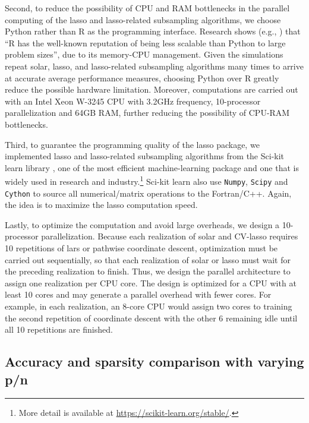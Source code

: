 \documentclass[12pt]{article}
\begin{document}
Second, to reduce the possibility of CPU and RAM bottlenecks in the parallel computing of the lasso and lasso-related subsampling algorithms, we choose Python rather than R as the programming interface. Research shows (e.g., \citet{donoho201750})  that ``R has the well-known reputation of being less scalable than Python to large problem sizes'', due to its memory-CPU management. Given the simulations repeat solar, lasso, and lasso-related subsampling algorithms many times to arrive at accurate average performance measures, choosing Python over R greatly reduce the possible hardware limitation. Moreover, computations are carried out with an Intel Xeon W-3245 CPU with 3.2GHz frequency, 10-processor parallelization and 64GB RAM, further reducing the possibility of CPU-RAM bottlenecks.

Third, to guarantee the programming quality of the lasso package, we implemented lasso and lasso-related subsampling algorithms from the {\sf Sci-kit learn} library \citep{scikit-learn}, one of the most efficient machine-learning package and one that is widely used in research and industry.\footnote{More detail is available at \url{https://scikit-learn.org/stable/}.} {\sf Sci-kit learn} also use \texttt{Numpy}, \texttt{Scipy} and \texttt{Cython} to source all numerical/matrix operations to the Fortran/C++. Again, the idea is to maximize the lasso computation speed.

Lastly, to optimize the computation and avoid large overheads, we design a 10-processor parallelization. Because each realization of solar and CV-lasso requires 10 repetitions of lars or pathwise coordinate descent, optimization must be carried out sequentially, so that each realization of solar or lasso must wait for the preceding realization to finish. Thus, we design the parallel architecture to assign one realization per CPU core. The design is optimized for a CPU with at least 10 cores and may generate a parallel overhead with fewer cores. For example, in each realization, an 8-core CPU would assign two cores to training the second repetition of coordinate descent with the other 6 remaining idle until all 10 repetitions are finished.

\subsection{Accuracy and sparsity comparison with varying p/n \label{subsection:suml1}}
\end{document}
